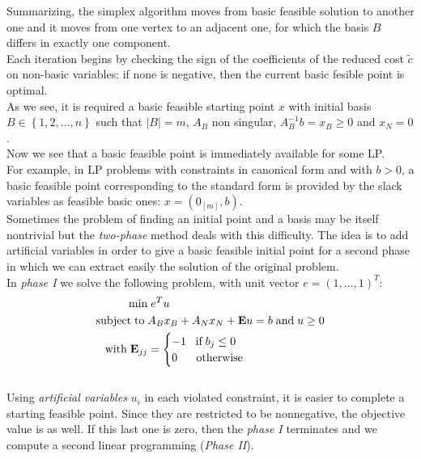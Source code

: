 \documentclass[a4paper,10 pt,titlepage,twoside]{book}
\theoremstyle{plain}
\theoremstyle{definition}
\theoremstyle{remark}
\begin{document}
Summarizing, the simplex algorithm moves from basic feasible solution to another one and it moves from one vertex to an adjacent one, for which the basis $B$ differs in exactly one component.\\ Each iteration begins by checking the sign of the coefficients of the reduced cost $\widetilde{c}$ on non-basic variables: if none is negative, then the current basic fesible point is optimal. \\
As we see, it is required a basic feasible starting point $x$ with initial basis $B \in \left\{ 1,2,..., n \right\}$ such that $|B|=m$, $A_{B}$ non singular, $A_{B}^{-1}b=x_{B} \geq 0$ and $x_{N}=0$.\\[1cm]
Now we see that a basic feasible point is immediately available for some LP.\\ For example, in LP problems with constraints in canonical form and with $b > 0$, a basic feasible point corresponding to the standard form is provided by the slack variables as feasible basic ones: $x =\left(0_{[m]},b\right)$.\\Sometimes the problem of finding an initial point and a basis may be itself nontrivial but the \textit{two-phase} method deals with this difficulty. The idea is to add artificial variables in order to give a basic feasible initial point for a second phase in which we can extract easily the solution of the original problem.\\
In \textit{phase I} we solve the following problem, with unit vector $e= (1,\dots,1)^{T}$:
\begin{equation}\label{IIPH}
\begin{split}
\min &\;e^{T}u\\
\text{subject\;to\;}&A_{B}x_{B}+A_{N}x_{N} + \textbf{E}u = b\;\text{and\;} u\geq 0\\
\text{with\;} \textbf{E}_{jj}& =\begin{cases} -1\;\text{\;\;if\;} b_{j} \leq 0\\
0\;\; \text{\;\;\;\;otherwise}
\end{cases}   
\end{split}
\end{equation} \\
Using \textit{artificial variables} $u_{i}$ in each violated constraint, it is easier to complete a starting feasible point. Since they are restricted to be nonnegative, the objective value is as well. If this last one is zero, then the \textit{phase I} terminates and we compute a second linear programming (\textit{Phase II}).\\
\end{document}
